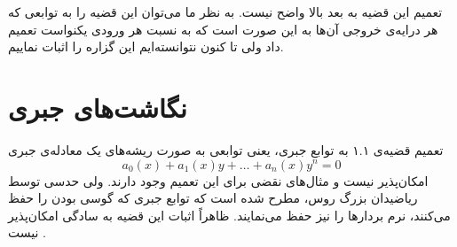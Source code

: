 \documentclass{article}
\begin{document}
تعمیم این قضیه‌ به بعد بالا واضح نیست. به نظر ما می‌توان این قضیه‌ را به توابعی که هر درایه‌ی خروجی آن‌ها به این صورت است که به نسبت هر ورودی یکنواست تعمیم داد ولی تا کنون نتوانسته‌ایم این گزاره را اثبات نماییم.
\section{نگاشت‌های جبری}

تعمیم قضیه‌ی ۱.۱ به توابع جبری، یعنی توابعی به صورت ریشه‌های یک معادله‌ی جبری
$$a_0(x) + a_1(x) y + \dots + a_n(x)y^n = 0 $$
امکان‌پذیر نیست و مثال‌های نقضی برای این تعمیم وجود دارند. ولی حدسی توسط ریاضیدان بزرگ روس،
مطرح شده است که توابع جبری که گوسی بودن را حفظ می‌کنند، نرم بردار‌ها را نیز حفظ می‌نمایند. ظاهراً اثبات این قضیه به سادگی امکان‌پذیر نیست
\cite{kagan1973characterization, linnik1968remark}.

	
	\begin{latin}
		
		
	\end{latin}
	
	\pagebreak
	
	
\end{document}
